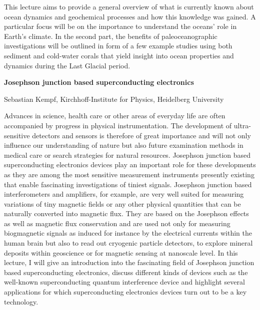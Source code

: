 This lecture aims to provide a general overview of what is currently known about ocean dynamics and geochemical processes and how this knowledge was gained. A particular focus will be on the importance to understand the oceans’ role in Earth’s climate. In the second part, the benefits of paleoceanographic investigations will be outlined in form of a few example studies using both sediment and cold-water corals that yield insight into ocean properties and dynamics during the Last Glacial period.
\par
\newpage

\begin{center}
{{\large\bfseries Josephson junction based superconducting electronics}\par} \medskip

{\large Sebastian Kempf, Kirchhoff-Institute for Physics, Heidelberg University\par}
\end{center}

\noindent Advances in science, health care or other areas of everyday life are often accompanied by progress in physical instrumentation. The development of ultra-sensitive detectors and sensors is therefore of great importance and will not only influence our understanding of nature but also future examination methods in medical care or search strategies for natural resources.
Josephson junction based superconducting electronics devices play an important role for these developments as they are among the most sensitive measurement instruments presently existing that enable fascinating investigations of tiniest signals. Josephson junction based interferometers and amplifiers, for example, are very well suited for measuring variations of tiny magnetic fields or any other physical quantities that can be naturally converted into magnetic flux. They are based on the Josephson effects as well as magnetic flux conservation and are used not only for measuring biogmagnetic signals as induced for instance by the electrical currents within the human brain but also to read out cryogenic particle detectors, to explore mineral deposits within geoscience or for magnetic sensing at nanoscale level.
In this lecture, I will give an introduction into the fascinating field of Josephson junction based superconducting electronics, discuss different kinds of devices such as the well-known superconducting quantum interference device and highlight several applications for which superconducting electronics devices turn out to be a key technology.


